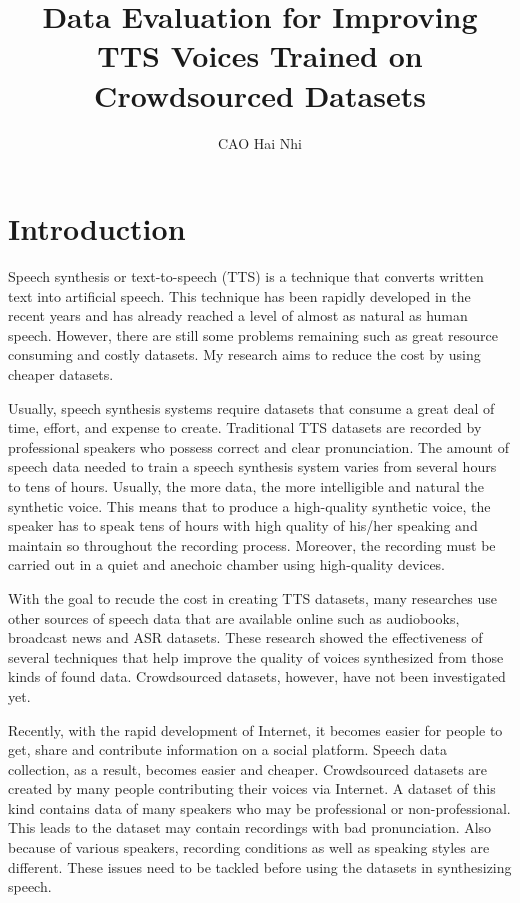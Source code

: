 \documentclass[12pt]{article}
\title{Data Evaluation for Improving TTS Voices Trained on Crowdsourced Datasets}
\author{CAO Hai Nhi}
\begin{document}
\titlepage
\cmemberspage
\firstabstract
%
%
\toc
\newpage
\listoffigures

\listoftables
%
%
\newpage


\section{Introduction}
Speech synthesis or text-to-speech (TTS) is a technique that converts written text into artificial speech. This technique has been rapidly developed in the recent years and has already reached a level of almost as natural as human speech. However, there are still some problems remaining such as great resource consuming and costly datasets. My research aims to reduce the cost by using cheaper datasets.

Usually, speech synthesis systems require datasets that consume a great deal of time, effort, and expense to create. Traditional TTS datasets are recorded by professional speakers who possess correct and clear pronunciation. The amount of speech data needed to train a speech synthesis system varies from several hours to tens of hours. Usually, the more data, the more intelligible and natural the synthetic voice. This means that to produce a high-quality synthetic voice, the speaker has to speak tens of hours with high quality of his/her speaking and maintain so throughout the recording process. Moreover, the recording must be carried out in a quiet and anechoic chamber using high-quality devices.

With the goal to recude the cost in creating TTS datasets, many researches use other sources of speech data that are available online such as audiobooks, broadcast news and ASR datasets. These research showed the effectiveness of several techniques that help improve the quality of voices synthesized from those kinds of found data. Crowdsourced datasets, however, have not been investigated yet.

Recently, with the rapid development of Internet, it becomes easier for people to get, share and contribute information on a social platform. Speech data collection, as a result, becomes easier and cheaper. Crowdsourced datasets are created by many people contributing their voices via Internet. A dataset of this kind contains data of many speakers who may be professional or non-professional. This leads to the dataset may contain recordings with bad pronunciation. Also because of various speakers, recording conditions as well as speaking styles are different. These issues need to be tackled before using the datasets in synthesizing speech.
\end{document}
